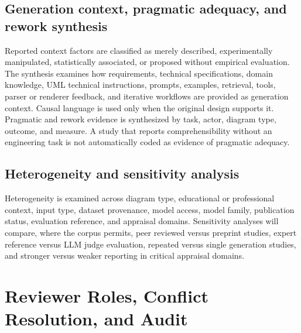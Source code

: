 \subsection{Generation context, pragmatic adequacy, and rework synthesis}

Reported context factors are classified as merely described, experimentally manipulated, statistically associated, or proposed without empirical evaluation. The synthesis examines how requirements, technical specifications, domain knowledge, UML technical instructions, prompts, examples, retrieval, tools, parser or renderer feedback, and iterative workflows are provided as generation context. Causal language is used only when the original design supports it. Pragmatic and rework evidence is synthesized by task, actor, diagram type, outcome, and measure. A study that reports comprehensibility without an engineering task is not automatically coded as evidence of pragmatic adequacy.

\subsection{Heterogeneity and sensitivity analysis}

Heterogeneity is examined across diagram type, educational or professional context, input type, dataset provenance, model access, model family, publication status, evaluation reference, and appraisal domains. Sensitivity analyses will compare, where the corpus permits, peer reviewed versus preprint studies, expert reference versus LLM judge evaluation, repeated versus single generation studies, and stronger versus weaker reporting in critical appraisal domains.

\section{Reviewer Roles, Conflict Resolution, and Audit}
\label{sec:protocol_reviewers}

